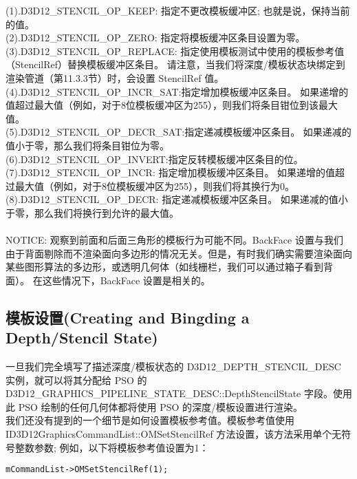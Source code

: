 \begin{flushleft}
(1).D3D12\_STENCIL\_OP\_KEEP: 指定不更改模板缓冲区; 也就是说，保持当前的值。\\
(2).D3D12\_STENCIL\_OP\_ZERO: 指定将模板缓冲区条目设置为零。\\
(3).D3D12\_STENCIL\_OP\_REPLACE: 指定使用模板测试中使用的模板参考值（StencilRef）替换模板缓冲区条目。 请注意，当我们将深度/模板状态块绑定到渲染管道（第11.3.3节）时，会设置 StencilRef 值。\\
(4).D3D12\_STENCIL\_OP\_INCR\_SAT:指定增加模板缓冲区条目。 如果递增的值超过最大值（例如，对于8位模板缓冲区为255），则我们将条目钳位到该最大值。\\
(5).D3D12\_STENCIL\_OP\_DECR\_SAT:指定递减模板缓冲区条目。 如果递减的值小于零，那么我们将条目钳位为零。\\
(6).D3D12\_STENCIL\_OP\_INVERT:指定反转模板缓冲区条目的位。\\
(7).D3D12\_STENCIL\_OP\_INCR: 指定增加模板缓冲区条目。 如果递增的值超过最大值（例如，对于8位模板缓冲区为255），则我们将其换行为0。\\
(8).D3D12\_STENCIL\_OP\_DECR: 指定递减模板缓冲区条目。 如果递减的值小于零，那么我们将换行到允许的最大值。\\
~\\
NOTICE: 观察到前面和后面三角形的模板行为可能不同。BackFace 设置与我们由于背面剔除而不渲染面向多边形的情况无关。但是，有时我们确实需要渲染面向某些图形算法的多边形，或透明几何体（如线栅栏，我们可以通过箱子看到背面）。 在这些情况下，BackFace 设置是相关的。
~\\
\end{flushleft}

\subsection{模板设置(Creating and Bingding a Depth/Stencil State)}
\begin{flushleft}
一旦我们完全填写了描述深度/模板状态的 D3D12\_DEPTH\_STENCIL\_DESC 实例，就可以将其分配给 PSO 的 D3D12\_GRAPHICS\_PIPELINE\_STATE\_DESC::DepthStencilState 字段。使用此 PSO 绘制的任何几何体都将使用 PSO 的深度/模板设置进行渲染。\\
我们还没有提到的一个细节是如何设置模板参考值。模板参考值使用 ID3D12GraphicsCommandList::OMSetStencilRef 方法设置，该方法采用单个无符号整数参数; 例如，以下将模板参考值设置为1：\\
\end{flushleft}

\begin{lstlisting}
mCommandList->OMSetStencilRef(1);
\end{lstlisting}

